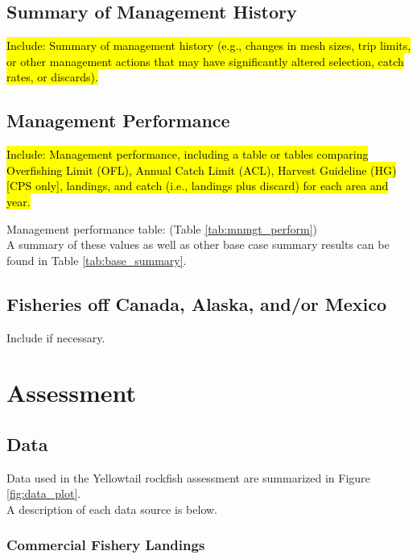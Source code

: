 \documentclass[12pt,]{article}
\begin{document}
\subsection{Summary of Management
History}\label{summary-of-management-history}

\hl{Include: Summary of management history (e.g., changes in mesh sizes, trip 
limits, or other management actions that may have significantly altered selection, 
catch rates, or discards).}

\subsection{Management Performance}\label{management-performance-1}

\hl{Include: Management performance, including a table or tables comparing 
Overfishing Limit (OFL), Annual Catch Limit (ACL), Harvest Guideline (HG) 
[CPS only], landings, and catch (i.e., landings plus discard) for each area and year.}

Management performance table: (Table \ref{tab:mnmgt_perform})\\
A summary of these values as well as other base case summary results can
be found in Table \ref{tab:base_summary}.

\subsection{Fisheries off Canada, Alaska, and/or
Mexico}\label{fisheries-off-canada-alaska-andor-mexico}

Include if necessary.

\section{Assessment}\label{assessment}

\subsection{Data}\label{data}

Data used in the Yellowtail rockfish assessment are summarized in Figure
\ref{fig:data_plot}.\\
A description of each data source is below.

\subsubsection{Commercial Fishery
Landings}\label{commercial-fishery-landings}
\end{document}
